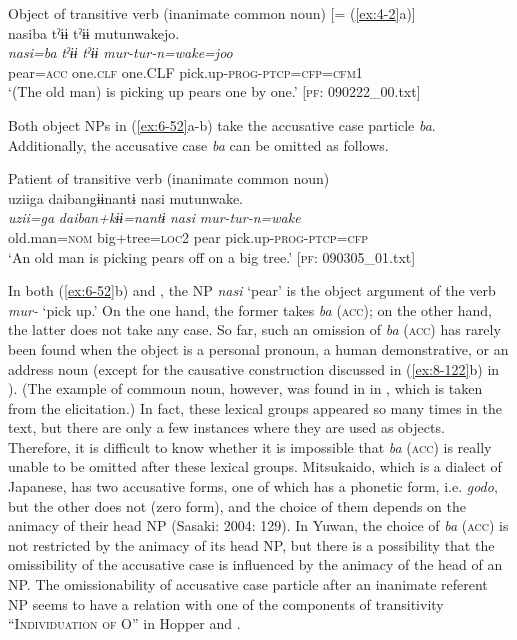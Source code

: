 \ex Object of transitive verb (inanimate common noun) [= (\ref{ex:4-2}a)]\\
{\TM}
\glll  nasiba  tˀɨɨ  tˀɨɨ  mutunwakejo.\\
\textit{nasi=ba}  \textit{tˀɨɨ}  \textit{tˀɨɨ}  \textit{mur-tur-n=wake=joo}\\
pear=\textsc{acc}  one.\textsc{clf}  one.CLF  pick.up-\textsc{prog}-\textsc{ptcp}=\textsc{cfp}=\textsc{cfm}1\\
\glt ‘(The old man) is picking up pears one by one.’ [\textsc{pf}: 090222\_00.txt]
\z

Both object NPs in (\ref{ex:6-52}a-b) take the accusative case particle \textit{ba}. Additionally, the accusative case \textit{ba} can be omitted as follows.

\ea\label{ex:6-53}
 Patient of transitive verb (inanimate common noun)\\

{\TM}
\glll uziiga  daibangɨɨnantɨ  nasi  mutunwake.\\
\textit{uzii=ga}  \textit{daiban+kɨɨ=nantɨ}  \textit{nasi}  \textit{mur-tur-n=wake}\\
    old.man=\textsc{nom}  big+tree=\textsc{loc2}  pear  pick.up-\textsc{prog}-\textsc{ptcp}=\textsc{cfp}\\
\glt    ‘An old man is picking pears off on a big tree.’ [\textsc{pf}: 090305\_01.txt]
\z

In both (\ref{ex:6-52}b) and , the NP \textit{nasi} ‘pear’ is the object argument of the verb \textit{mur-} ‘pick up.’ On the one hand, the former takes \textit{ba} (\textsc{acc}); on the other hand, the latter does not take any case. So far, such an omission of \textit{ba} (\textsc{acc}) has rarely been found when the object is a personal pronoun, a human demonstrative, or an address noun (except for the causative construction discussed in (\ref{ex:8-122}b) in ). (The example of commoun noun, however, was found in  in , which is taken from the elicitation.) In fact, these lexical groups appeared so many times in the text, but there are only a few instances where they are used as objects. Therefore, it is difficult to know whether it is impossible that \textit{ba} (\textsc{acc}) is really unable to be omitted after these lexical groups. Mitsukaido, which is a dialect of Japanese, has two accusative forms, one of which has a phonetic form, i.e. \textit{godo}, but the other does not (zero form), and the choice of them depends on the animacy of their head NP (Sasaki: 2004: 129). In Yuwan, the choice of \textit{ba} (\textsc{acc}) is not restricted by the animacy of its head NP, but there is a possibility that the omissibility of the accusative case is influenced by the animacy of the head of an NP. The omissionability of accusative case particle after an inanimate referent NP seems to have a relation with one of the components of transitivity “I\textsc{ndividuation} \textsc{of} O” in Hopper and \citet[252]{Thompson1980}.

